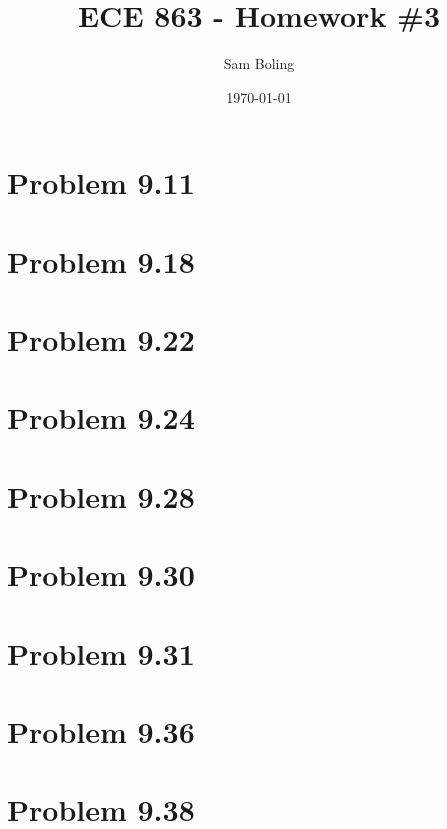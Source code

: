 \documentclass{article}
\title{ECE 863 - Homework \#3}
\author{Sam Boling}
\date{\today}
\begin{document}
\maketitle

\section*{Problem 9.11}


\section*{Problem 9.18}

\section*{Problem 9.22}

\section*{Problem 9.24}

\section*{Problem 9.28}

\section*{Problem 9.30}

\section*{Problem 9.31}

\section*{Problem 9.36}

\section*{Problem 9.38}
\end{document}
